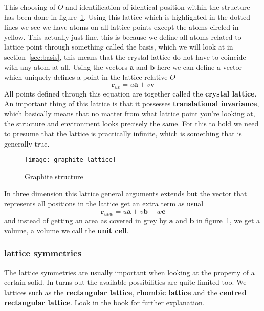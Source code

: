 \documentclass[11pt]{article}
\begin{document}
\newpage
This choosing of $O$ and identification of identical position within the structure has been done in figure~\ref{fig:graphite-lattice}. Using this lattice which is highlighted in the dotted lines we see we have atoms on all lattice points except the atoms circled in yellow. This actually just fine, this is because we define all atoms related to lattice point through something called the basis, which we will look at in section~\ref{sec:basis}, this means that the crystal lattice do not have to coincide with any atom at all. Using the vectors $\mathbf{a}$ and $\mathbf{b}$ here we can define a vector which uniquely defines a point in the lattice relative $O$
\begin{equation}
	\mathbf{r}_{uv }= u\mathbf{a} + v\mathbf{v}
	\label{eq:crystal-lattice}
\end{equation}
All points defined through this equation are together called the \textbf{crystal lattice}. An important thing of this lattice is that it possesses \textbf{translational invariance}, which basically means that no matter from what lattice point you're looking at, the structure and environment looks precisely the same. For this to hold we need to presume that the lattice is practically infinite, which is something that is generally true. 

\begin{figure}[H]
	\centering
	\texttt{[image: graphite-lattice]}
	\caption{Graphite structure}
	\label{fig:graphite-lattice}
\end{figure}

In three dimension this lattice general arguments extends but the vector that represents all positions in the lattice get an extra term as usual
\begin{equation}
	\mathbf{r}_{uvw} = u\mathbf{a} + v\mathbf{b} + w\mathbf{c}
	\label{eq:crystal-lattice-3d}
\end{equation}
and instead of getting an area as covered in grey by $\mathbf{a}$ and $\mathbf{b}$ in figure~\ref{fig:graphite-lattice}, we get a volume, a volume we call the \textbf{unit cell}.

\subsubsection{lattice symmetries}
The lattice symmetries are usually important when looking at the property of a certain solid. In turns out the available possibilities are quite limited too. We lattices such as the \textbf{rectangular lattice}, \textbf{rhombic lattice} and the \textbf{centred rectangular lattice}. Look in the book for further explanation.
\end{document}
